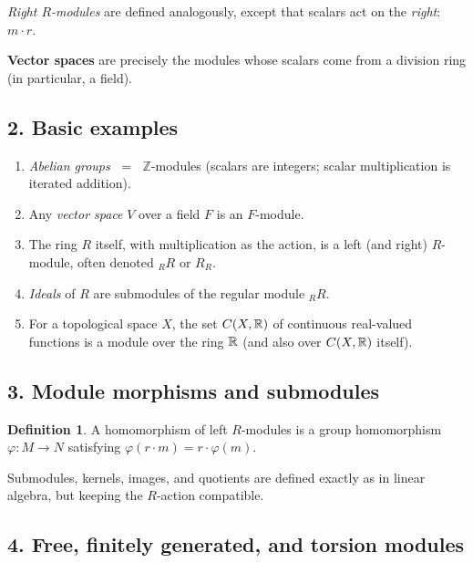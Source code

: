 \documentclass[12pt]{article}
\theoremstyle{definition} %
\newtheorem{definition}{Definition}
\theoremstyle{plain} %
\begin{document}
\noindent
\emph{Right $R$-modules} are defined analogously, except that scalars
act on the \emph{right}: $m\cdot r$.

\medskip
\textbf{Vector spaces} are precisely the modules whose scalars come from
a division ring (in particular, a field).

\subsection*{2.  Basic examples}

\begin{enumerate}
   \item \emph{Abelian groups} $\;=\;$ $\mathbb Z$-modules  
         (scalars are integers; scalar multiplication is iterated
         addition).

   \item Any \emph{vector space} $V$ over a field $F$ is an $F$-module.

   \item The ring $R$ itself, with multiplication as the action,
         is a left (and right) $R$-module, often denoted ${}_R R$ or
         $R_R$.

   \item \emph{Ideals} of $R$ are submodules of the regular module
         ${}_R R$.

   \item For a topological space $X$, the set $C(X,\Bbb R)$ of
         continuous real-valued functions is a module over the ring
         $\Bbb R$ (and also over $C(X,\Bbb R)$ itself).
\end{enumerate}

\subsection*{3.  Module morphisms and submodules}

\begin{definition}
A homomorphism of left $R$-modules is a group homomorphism
$\varphi:M\to N$ satisfying $\varphi(r\cdot m)=r\cdot\varphi(m)$.
\end{definition}

\noindent
Submodules, kernels, images, and quotients are defined exactly as in
linear algebra, but keeping the $R$-action compatible.

\subsection*{4.  Free, finitely generated, and torsion modules}
\end{document}
